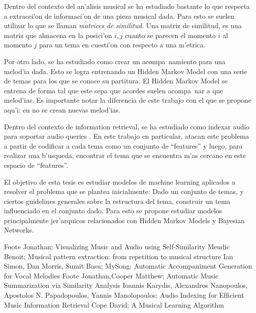 \documentclass[a4paper,10pt]{article}
\begin{document}
\begin{description}
	
	Dentro del contexto del an'alisis musical se ha estudiado bastante lo que respecta a extracci'on de 
	informaci'on de una pieza musical dada\cite{FXPAL}\cite{BeMe}\cite{FooJoCooMa}. 
	Para esto se suelen utilizar lo que se llaman \emph{matrices de similitud}.  Una matriz de similitud, 
	es una matriz que almacena en la posici'on $i, j$ cuanto se parecen el momento $i$ al momento $j$ 
	para un tema en cuesti'on con respecto a una m'etrica. 


	Por otro lado, se ha estudiado como crear un acompa~namiento para una melod'ia dada\cite{MySong}. 
	Esto se logra entrenando un Hidden Markov Model con una serie de temas para los que se conoce su 
	partitura. El Hidden Markov Model se entrena de forma tal que este sepa que acordes suelen acompa~nar 
	a que melod'ias.  Es importante notar la diferencia de este trabajo con el que se propone aqu'i: 
	en \cite{MySong} no se crean nuevas melod'ias.


	Dentro del contexto de information retrieval, se ha estudiado como indexar audio para soportar audio
	queries \cite{IoAlApYa}. En este trabajo en particular, atacan este problema a partir de codificar a cada 
	tema como un conjunto de ``features'' y luego, para realizar una b'usqueda, encontrar el tema que 
	se encuentra m'as cercano en este espacio de ``features''. 


	El objetivo de esta tesis es estudiar modelos de machine learning aplicados a resolver el problema que
	se plantea inicialmente: Dado un conjunto de temas, y ciertos guidelines generales sobre la estructura
	del tema, construir un tema influenciado en el conjunto dado. Para esto se propone estudiar modelos 
	principalmente jer'arquicos relacionados con Hidden Markov Models y Bayesian Networks.

 \end{description}

\begin{thebibliography}{99}
 Foote Jonathan; Visualizing Music and Audio using Self-Similarity
 Meudic Benoit; Musical pattern extraction: from repetition to musical structure
 Ian Simon, Dan Morris, Sumit Basu; MySong: Automatic Accompaniment Generation for Vocal Melodies
Foote Jonathan,Cooper Matthew; Automatic Music Summarization via Similarity Analysis
Ioannis Karydis, Alexandros Nanopoulos, Apostolos N. Papadopoulos, Yannis Manolopoulos; Audio Indexing for Efﬁcient Music Information Retrieval
 Cope David; A Musical Learning Algorithm


\end{thebibliography}
\end{document}
